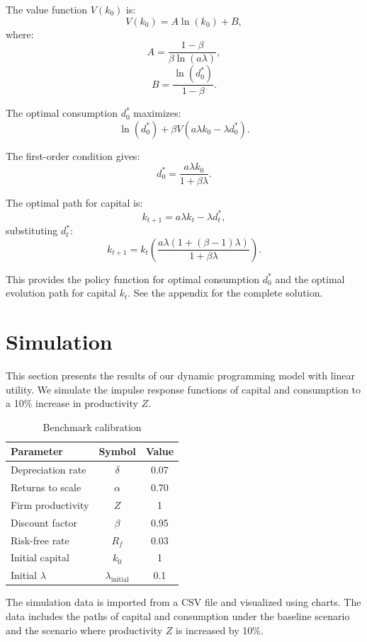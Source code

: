 \documentclass[12pt]{report}
\begin{document}
The value function \( V(k_0) \) is:
\[
V(k_0) = A \ln(k_0) + B,
\]
where:
\[
A = \frac{1 - \beta}{\beta \ln(a \lambda)},
\]
\[
B = \frac{\ln(d_0^*)}{1 - \beta}.
\]

The optimal consumption \( d_0^* \) maximizes:
\[
\ln(d_0^*) + \beta V(a \lambda k_0 - \lambda d_0^*).
\]

The first-order condition gives:
\[
d_0^* = \frac{a \lambda k_0}{1 + \beta \lambda}.
\]

The optimal path for capital is:
\[
k_{t+1} = a \lambda k_t - \lambda d_t^*,
\]
substituting \( d_t^* \):
\[
k_{t+1} = k_t \left( \frac{a \lambda (1 + (\beta - 1) \lambda)}{1 + \beta \lambda} \right).
\]

This provides the policy function for optimal consumption \( d_0^* \) and the optimal evolution path for capital \( k_t \). See the appendix for the complete solution.

  \section{Simulation}

This section presents the results of our dynamic programming model with linear utility. We simulate the impulse response functions of capital and consumption to a 10\% increase in productivity \(Z\).

\begin{table}[H]
    \centering
    \begin{tabular}{lcc}
    \hline Parameter & Symbol & Value \\
    \hline \hline
    Depreciation rate & $\delta$ & 0.07 \\
    Returns to scale & $\alpha$ & 0.70 \\
    Firm productivity & $Z$ & 1 \\
    Discount factor & $\beta$ & 0.95 \\
    Risk-free rate & $R_f$ & 0.03 \\
    Initial capital & $k_0$ & 1 \\
    Initial $\lambda$ & $\lambda_{\text{initial}}$ & 0.1 \\
    \hline
    \end{tabular}
    \caption{Benchmark calibration}
    \label{tab:benchmark_calibration}
\end{table}

The simulation data is imported from a CSV file and visualized using charts. The data includes the paths of capital and consumption under the baseline scenario and the scenario where productivity \(Z\) is increased by 10\%.
\end{document}
